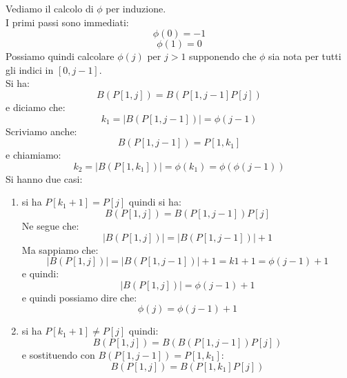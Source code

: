 \documentclass[a4paper,12pt, oneside]{book}
\begin{document}
\begin{definizione}
  Vediamo il calcolo di $\phi$ per induzione.\\
  I primi passi sono immediati:
  \[\phi(0)=-1\]
  \[\phi(1)=0\]
  Possiamo quindi calcolare $\phi(j)$ per $j>1$ supponendo che $\phi$ sia nota
  per tutti gli indici in $[0,j-1]$.\\
  Si ha:
  \[B(P[1,j])=B(P[1, j-1]P[j])\]
  e diciamo che:
  \[k_1=|B(P[1, j-1])|=\phi(j-1)\]
  Scriviamo anche:
  \[B(P[1,j-1]) = P[1,k_1]\]
  e chiamiamo:
  \[k_2=|B(P[1,k_1])|=\phi(k_1)=\phi(\phi(j-1))\]
  Si hanno due casi:
  \begin{enumerate}
    \item si ha $P[k_1+1]=P[j]$ quindi si ha:
    \[B(P[1,j])=B(P[1,j-1])P[j]\]
    Ne segue che:
    \[|B(P[1,j])| = |B(P[1,j-1])| + 1 \]
    Ma sappiamo che:
    \[|B(P[1,j])| = |B(P[1,j-1])| + 1 = k1 + 1 = \phi(j-1) + 1\]
    e quindi:
    \[|B(P[1,j])| = \phi(j-1) + 1\]
    e quindi possiamo dire che:
    \[\phi(j) = \phi(j-1) + 1 \]
    \item si ha $P[k_1+1]\neq P[j]$ quindi:
    \[B(P[1,j]) = B(B(P[1,j-1]) P[j])\]
    e sostituendo con $B(P[1,j-1]) = P[1,k_1]$:
    \[B(P[1,j]) = B(P[1,k_1] P[j])\]
    

\end{enumerate}
\end{definizione}
\end{document}
